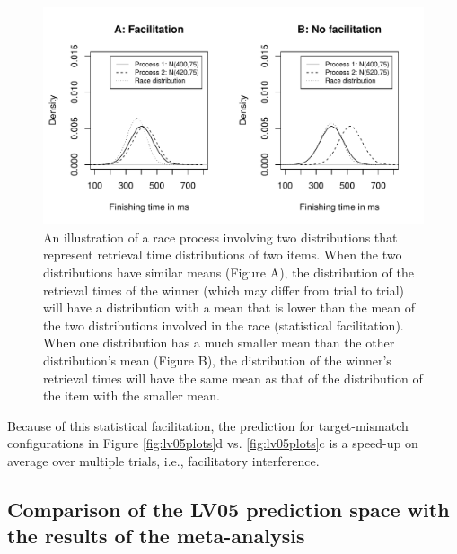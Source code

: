 \documentclass{cambridge7A}\usepackage[]{graphicx}\usepackage[]{color}
\begin{document}
\begin{figure}[!htbp]
\centering
\includegraphics[width=.9\textwidth]{figures/fig-raceproc1}
\caption{An illustration of a race process involving two distributions that represent retrieval time distributions of two items. When the two distributions have similar means (Figure A), the distribution of the retrieval times of the winner (which may differ from trial to trial) will have a distribution with a mean that is lower than the mean of the two distributions involved in the race (statistical facilitation). When one distribution has a much smaller mean than the other distribution's mean (Figure B), the distribution of the winner's retrieval times will have the same mean as that of the distribution of the item with the smaller mean.}\label{fig:raceproc}
\end{figure}


Because of this statistical facilitation, the prediction for target-mismatch configurations in Figure \ref{fig:lv05plots}d vs. \ref{fig:lv05plots}c is a speed-up on average over multiple trials, i.e., facilitatory interference.




\subsection{Comparison of the LV05 prediction space with the results of the meta-analysis}
\end{document}
